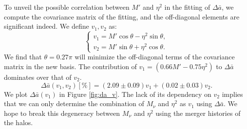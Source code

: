 To unveil the possible correlation between $M'$ and $\eta^2$ in the fitting of $\Delta \bar a$, we compute the covariance matrix of the fitting, and the off-diagonal elements are significant indeed. We define $v_1, v_2$ as:
\begin{equation}
\label{eq:rot}
    \begin{cases}
    v_1 = M'\cos \theta  - \eta^2 \sin \theta,  \\ 
    v_2 = M' \sin \theta  + \eta^2\cos \theta.
    \end{cases}
\end{equation}
We find that $\theta = 0.27\pi$ will minimize the off-diagonal terms of the covariance matrix in the new basis. The contribution of $v_1 = (0.66 M' - 0.75\eta^2)$ to $\Delta \bar a$ dominates over that of $v_2$.
\begin{equation}
\label{eq:reg_v1}
    \Delta \bar a(v_1, v_2) [\%] = (2.09\pm0.09) v_1 + (0.02\pm0.03) v_2.
\end{equation}
We plot $\Delta \bar a(v_1)$ in Figure \ref{fig:da_v}. The lack of its dependency on $v_2$ implies that we can only determine the combination of $M_\nu$ and $\eta^2$ as $v_1$ using $\Delta \bar a$. We hope to break this degeneracy between $M_\nu$ and $\eta^2$ using the merger histories of the halos.


